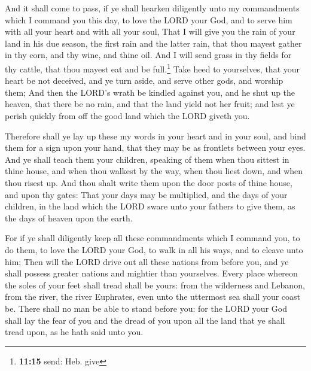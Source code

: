  And it shall come to pass, if ye shall hearken
diligently unto my commandments which I command you this day, to love
the LORD your God, and to serve him with all your heart and with all
your soul,  That I will give you the rain of your land in
his due season, the first rain and the latter rain, that thou mayest
gather in thy corn, and thy wine, and thine oil.  And I
will send grass in thy fields for thy cattle, that thou mayest eat and
be full.\footnote{\textbf{11:15} send: Heb. give}  Take
heed to yourselves, that your heart be not deceived, and ye turn aside,
and serve other gods, and worship them;  And then the
LORD's wrath be kindled against you, and he shut up the heaven, that
there be no rain, and that the land yield not her fruit; and lest ye
perish quickly from off the good land which the LORD giveth you.

 Therefore shall ye lay up these my words in your heart
and in your soul, and bind them for a sign upon your hand, that they may
be as frontlets between your eyes.  And ye shall teach
them your children, speaking of them when thou sittest in thine house,
and when thou walkest by the way, when thou liest down, and when thou
risest up.  And thou shalt write them upon the door posts
of thine house, and upon thy gates:  That your days may
be multiplied, and the days of your children, in the land which the LORD
sware unto your fathers to give them, as the days of heaven upon the
earth.

 For if ye shall diligently keep all these commandments
which I command you, to do them, to love the LORD your God, to walk in
all his ways, and to cleave unto him;  Then will the LORD
drive out all these nations from before you, and ye shall possess
greater nations and mightier than yourselves.  Every
place whereon the soles of your feet shall tread shall be yours: from
the wilderness and Lebanon, from the river, the river Euphrates, even
unto the uttermost sea shall your coast be.  There shall
no man be able to stand before you: for the LORD your God shall lay the
fear of you and the dread of you upon all the land that ye shall tread
upon, as he hath said unto you.

